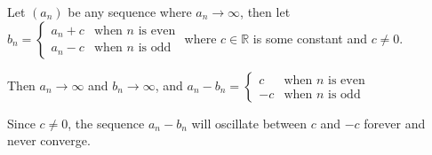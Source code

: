 \documentclass[a4paper]{article}
\begin{document}
Let $(a_n)$ be any sequence where $a_n \to \infty$, then let $b_n = \begin{cases}
	a_n + c &\text{when } n \text{ is even}\\[1ex]
	a_n - c &\text{when } n \text{ is odd}
\end{cases}$ where $c \in \mathbb R$ is some constant and $c \ne 0$.

Then $a_n \to \infty$ and $b_n \to \infty$, and $a_n - b_n = \begin{cases}
	c  &\text{when } n \text{ is even}\\[1ex]
	-c &\text{when } n \text{ is odd}
\end{cases}$

Since $c \ne 0$, the sequence $a_n - b_n$ will oscillate between $c$ and $-c$ forever and never converge.
\end{document}
